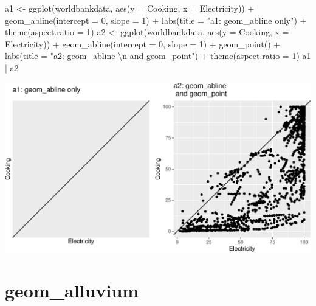 \documentclass[
  letterpaper,
  DIV=11,
  numbers=noendperiod]{scrreprt}
\newenvironment{Shaded}{\begin{snugshade}}{\end{snugshade}}
\newcommand{\AttributeTok}[1]{\textcolor[rgb]{0.40,0.45,0.13}{#1}}
\newcommand{\DecValTok}[1]{\textcolor[rgb]{0.68,0.00,0.00}{#1}}
\newcommand{\FunctionTok}[1]{\textcolor[rgb]{0.28,0.35,0.67}{#1}}
\newcommand{\NormalTok}[1]{\textcolor[rgb]{0.00,0.23,0.31}{#1}}
\newcommand{\OtherTok}[1]{\textcolor[rgb]{0.00,0.23,0.31}{#1}}
\newcommand{\SpecialCharTok}[1]{\textcolor[rgb]{0.37,0.37,0.37}{#1}}
\newcommand{\StringTok}[1]{\textcolor[rgb]{0.13,0.47,0.30}{#1}}
\begin{document}
\begin{Shaded}
\begin{Highlighting}[]
\NormalTok{a1 }\OtherTok{\textless{}{-}} \FunctionTok{ggplot}\NormalTok{(worldbankdata, }\FunctionTok{aes}\NormalTok{(}\AttributeTok{y =}\NormalTok{ Cooking, }\AttributeTok{x =}\NormalTok{ Electricity)) }\SpecialCharTok{+}
  \FunctionTok{geom\_abline}\NormalTok{(}\AttributeTok{intercept =} \DecValTok{0}\NormalTok{, }\AttributeTok{slope =} \DecValTok{1}\NormalTok{) }\SpecialCharTok{+}
  \FunctionTok{labs}\NormalTok{(}\AttributeTok{title =} \StringTok{"a1: geom\_abline only"}\NormalTok{) }\SpecialCharTok{+}
  \FunctionTok{theme}\NormalTok{(}\AttributeTok{aspect.ratio =} \DecValTok{1}\NormalTok{)}
\NormalTok{a2 }\OtherTok{\textless{}{-}} \FunctionTok{ggplot}\NormalTok{(worldbankdata, }\FunctionTok{aes}\NormalTok{(}\AttributeTok{y =}\NormalTok{ Cooking, }\AttributeTok{x =}\NormalTok{ Electricity)) }\SpecialCharTok{+}
  \FunctionTok{geom\_abline}\NormalTok{(}\AttributeTok{intercept =} \DecValTok{0}\NormalTok{, }\AttributeTok{slope =} \DecValTok{1}\NormalTok{) }\SpecialCharTok{+}
  \FunctionTok{geom\_point}\NormalTok{() }\SpecialCharTok{+}
  \FunctionTok{labs}\NormalTok{(}\AttributeTok{title =} \StringTok{"a2: geom\_abline }\SpecialCharTok{\textbackslash{}n}\StringTok{ and geom\_point"}\NormalTok{) }\SpecialCharTok{+}
  \FunctionTok{theme}\NormalTok{(}\AttributeTok{aspect.ratio =} \DecValTok{1}\NormalTok{)}
\NormalTok{a1 }\SpecialCharTok{|}\NormalTok{ a2}
\end{Highlighting}
\end{Shaded}

\includegraphics{a_files/figure-pdf/unnamed-chunk-2-1.pdf}

\section{geom\_alluvium}\label{alluvium}
\end{document}
